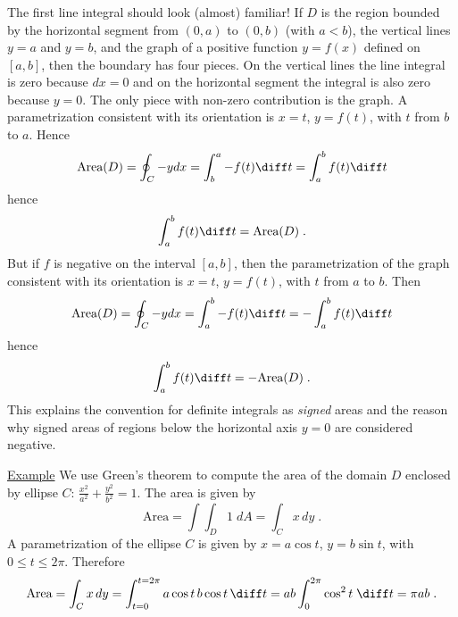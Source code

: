 \begin{frame}
\small
  \frametitle{}
 
  The first line integral should look (almost) familiar! If $D$ is the region bounded by the horizontal segment from $(0,a)$ to $(0,b)$ (with $a<b$), the vertical lines $y=a$ and $y=b$, and the graph of a positive function $y=f(x)$ defined on $[a,b]$, then the boundary has four pieces. On the vertical lines the line integral is zero because $dx=0$ and on the horizontal segment the integral is also zero because $y=0$. The only piece with non-zero contribution is the graph. A parametrization consistent with its orientation is $x=t$, $y=f(t)$, with $t$ from $b$ to $a$. Hence
%
$$\text{Area}(D) = \oint_C -ydx = \int_b^a -f(t)\diff t = \int_a^b f(t) \diff t$$
%
hence
%
$$\int_a^b f(t) \diff t = \text{Area}(D)\; .$$
%
But if $f$ is negative on the interval $[a,b]$, then the parametrization of the graph consistent with its orientation is $x=t$, $y=f(t)$, with $t$ from $a$ to $b$. Then
%
$$\text{Area}(D) = \oint_C -ydx = \int_a^b -f(t)\diff t = - \int_a^b f(t) \diff t$$
%
hence
%
$$\int_a^b f(t) \diff t = - \text{Area}(D) \; .$$
%
This explains the convention for definite integrals as \emph{signed} areas and the reason why signed areas of regions below the horizontal axis $y=0$ are considered negative.

  \underline{Example} We use Green's theorem to compute the area of the domain $D$ enclosed by ellipse $C$: $\frac{x^2}{a^2}+\frac{y^2}{b^2}=1$. The area is given by
%
$$\text{Area} = \int\!\!\!\int_D 1\; dA = \int_C x\, dy\; .$$
%
A parametrization of the ellipse $C$ is given by $x=a\cos{t}$, $y= b\sin{t}$, with $0 \leqslant t \leqslant 2\pi$. Therefore
%
$$\text{Area} = \int_C x\, dy = \int_{t=0}^{t=2\pi} a\cos{t}\, b\cos{t}\, \diff t = ab\int_0^{2\pi} \cos^2{t} \; \diff t = \pi ab\; .$$
\end{frame}